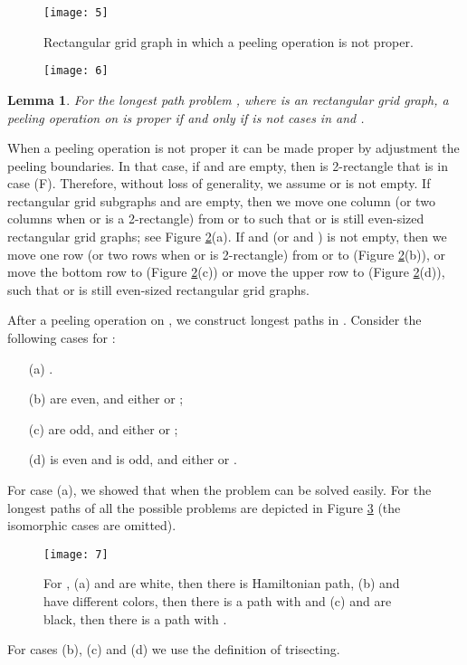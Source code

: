 \documentclass[preprint,12pt]{elsarticle}
\newtheorem{lem}{Lemma}[section]
\begin{document}
\begin{figure}[tb]
  \centering
  \texttt{[image: 5]}
  \caption[]{\small Rectangular grid graph in which a peeling operation is not proper.}
  \label{bs}
\end{figure}
\begin{figure}[tb]
  \centering
  \texttt{[image: 6]}
  \caption[]{\small }
  \label{bj}
\end{figure}
\begin{lem} \label{Lemma:7} For the longest path problem , where
 is an  rectangular grid graph, a peeling
operation on  is proper if and only if  is
not cases in  and .
\end{lem}
When a peeling operation is not proper it can be made proper by
adjustment the peeling boundaries. In that case, if  and  are empty, then  is 2-rectangle that
is in case (F). Therefore, without loss of generality, we
assume  or  is not empty. If
rectangular grid subgraphs  and  are empty, then we
move one column (or two columns when  or  is a
2-rectangle) from  or  to  such that  or
 is still even-sized rectangular grid graphs; see Figure
\ref{bj}(a). If  and  (or  and
) is not empty, then we move one row (or two rows when
 or  is 2-rectangle) from  or  to
 (Figure \ref{bj}(b)), or move the bottom row to 
(Figure \ref{bj}(c)) or move the upper row to  (Figure
\ref{bj}(d)), such that  or  is still even-sized
rectangular grid graphs.
\par After a peeling operation on , we construct longest paths
in . Consider the following cases for :
\begin{itemize}
\item[(a)] .
\item[(b)]  are even, and either  or ;
\item[(c)]  are odd, and either  or ;
\item[(d)]  is even and  is odd, and either  or .
\end{itemize}
For case (a), we showed that when  the problem can be solved
easily. For  the longest paths of all the possible problems
are depicted in Figure \ref{k} (the isomorphic cases are omitted).
 \begin{figure}
  \centering
\texttt{[image: 7]}
  \caption[]{\small For , (a)  and  are white, then there is Hamiltonian path,
   (b)  and  have different colors, then there is a path with 
   and (c)  and  are black, then there is a path with .}
  \label{k}
\end{figure}
\par For cases (b), (c) and (d) we use
the definition of trisecting.\\
\end{document}
